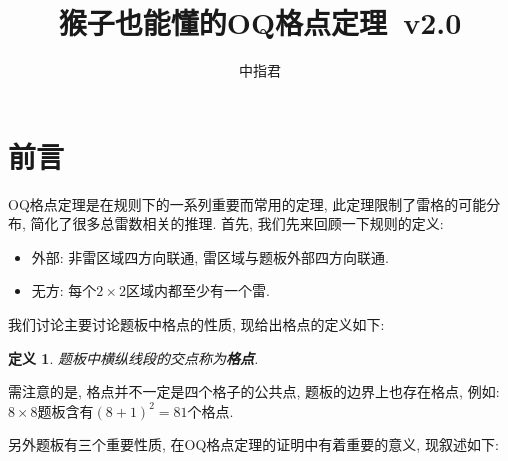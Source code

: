 \documentclass{ctexart}
\title{猴子也能懂的OQ格点定理\ v2.0}
\author{中指君}
\newcommand{\varible}[1]{{\Noto[#1]}}
\newtheorem{definition}{定义}
\begin{document}
\maketitle
\tableofcontents
\pagebreak
\section{前言}
OQ格点定理是在\varible{O}\varible{Q}规则下的一系列重要而常用的定理, 此定理限制了雷格的可能分布, 简化了很多总雷数相关的推理.
首先, 我们先来回顾一下\varible{O}\varible{Q}规则的定义:
\begin{itemize}
    \item \varible{O}{\heiti 外部: 非雷区域四方向联通, 雷区域与题板外部四方向联通.}
    \item \varible{Q}{\heiti 无方: 每个$2\times2$区域内都至少有一个雷.}
\end{itemize}

我们讨论主要讨论题板中格点的性质, 现给出格点的定义如下:
\begin{definition}
    题板中横纵线段的交点称为\textbf{格点}.
\end{definition}
需注意的是, 格点并不一定是四个格子的公共点, 题板的边界上也存在格点, 例如: $8\times8$题板含有$(8+1)^2 = 81$个格点.

另外\varible{O}\varible{Q}题板有三个重要性质, 在OQ格点定理的证明中有着重要的意义, 现叙述如下:
\end{document}
